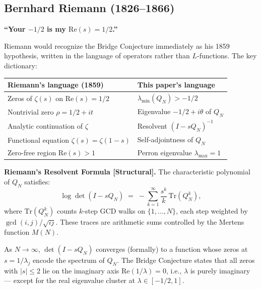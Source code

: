 \documentclass[12pt]{article}
\begin{document}
\subsection*{Bernhard Riemann (1826--1866)}

\textbf{``Your $-1/2$ is my $\mathrm{Re}(s) = 1/2$.''}

Riemann would recognize the Bridge Conjecture immediately as his 1859 hypothesis,
written in the language of operators rather than $L$-functions.
The key dictionary:

\begin{center}
\renewcommand{\arraystretch}{1.5}
\small
\begin{tabular}{@{}ll@{}}
\toprule
\textbf{Riemann's language (1859)} & \textbf{This paper's language} \\
\midrule
Zeros of $\zeta(s)$ on $\mathrm{Re}(s) = 1/2$ & $\lambda_{\min}(Q_N) > -1/2$ \\
Nontrivial zero $\rho = 1/2 + it$ & Eigenvalue $-1/2 + i\theta$ of $Q_N$ \\
Analytic continuation of $\zeta$ & Resolvent $(I - sQ_N)^{-1}$ \\
Functional equation $\zeta(s) = \zeta(1-s)$ & Self-adjointness of $Q_N$ \\
Zero-free region $\mathrm{Re}(s) > 1$ & Perron eigenvalue $\lambda_{\max} = 1$ \\
\bottomrule
\end{tabular}
\end{center}

\begin{tcolorbox}[keybox]
\textbf{Riemann's Resolvent Formula [Structural].}
The characteristic polynomial of $Q_N$ satisfies:
\[
  \log \det(I - sQ_N)
  \;=\; -\sum_{k=1}^\infty \frac{s^k}{k}\,\mathrm{Tr}(Q_N^k),
\]
where $\mathrm{Tr}(Q_N^k)$ counts $k$-step GCD walks on $\{1,\ldots,N\}$,
each step weighted by $\gcd(i,j)/\sqrt{ij}$.
These traces are arithmetic sums controlled by the Mertens function $M(N)$.

As $N \to \infty$, $\det(I - sQ_N)$ converges (formally) to a function
whose zeros at $s = 1/\lambda_j$ encode the spectrum of $Q_N$.
The Bridge Conjecture states that all zeros with $|s| \le 2$ lie on the imaginary axis
$\mathrm{Re}(1/\lambda) = 0$, i.e., $\lambda$ is purely imaginary --- except
for the real eigenvalue cluster at $\lambda \in [-1/2, 1]$.
\end{tcolorbox}
\end{document}

